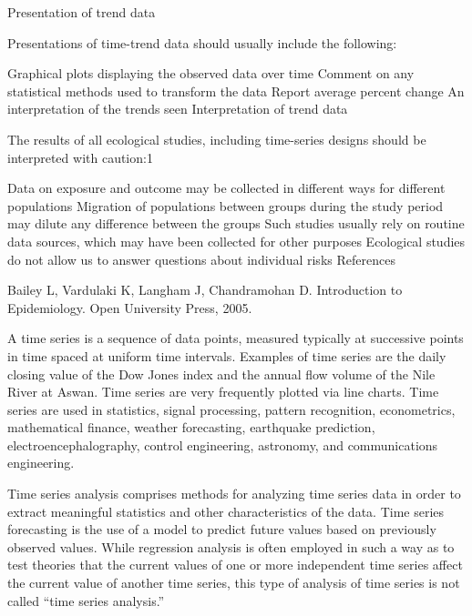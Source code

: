 \documentclass{article}\usepackage[]{graphicx}\usepackage[]{color}
\begin{document}
Presentation of trend data

Presentations of time-trend data should usually include the following:

Graphical plots displaying the observed data over time
Comment on any statistical methods used to transform the data
Report average percent change
An interpretation of the trends seen
Interpretation of trend data

The results of all ecological studies, including time-series designs should be interpreted with caution:1

Data on exposure and outcome may be collected in different ways for different populations
Migration of populations between groups during the study period may dilute any difference between the groups
Such studies usually rely on routine data sources, which may have been collected for other purposes
Ecological studies do not allow us to answer questions about individual risks
References

Bailey L, Vardulaki K, Langham J, Chandramohan D. Introduction to Epidemiology. Open University Press, 2005.

A time series is a sequence of data points, measured typically at successive points in time spaced at uniform time intervals. Examples of time series are the daily closing value of the Dow Jones index and the annual flow volume of the Nile River at Aswan. Time series are very frequently plotted via line charts. Time series are used in statistics, signal processing, pattern recognition, econometrics, mathematical finance, weather forecasting, earthquake prediction, electroencephalography, control engineering, astronomy, and communications engineering.

Time series analysis comprises methods for analyzing time series data in order to extract meaningful statistics and other characteristics of the data. Time series forecasting is the use of a model to predict future values based on previously observed values. While regression analysis is often employed in such a way as to test theories that the current values of one or more independent time series affect the current value of another time series, this type of analysis of time series is not called ``time series analysis.''
\end{document}
